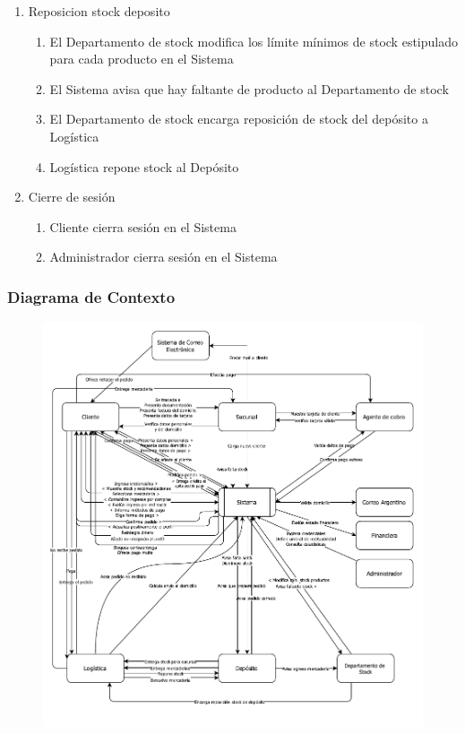 \begin{enumerate}
 \item Reposicion stock deposito
  \begin{enumerate}
    \item El Departamento de stock modifica los límite m\'inimos de stock estipulado para cada producto en el Sistema
    \item El Sistema avisa que hay faltante de producto al Departamento de stock
    \item El Departamento de stock encarga reposición de stock del depósito a Logística
    \item Logística repone stock al Depósito
  \end{enumerate}

 \item Cierre de sesi\'on
  \begin{enumerate}
    \item Cliente cierra sesión en el Sistema
    \item Administrador	cierra sesión en el Sistema
  \end{enumerate}
\end{enumerate}
\clearpage

\subsubsection{Diagrama de Contexto}

\begin{figure}[H]
  \includegraphics[width=\linewidth]{images/contexto.pdf}
  \caption{}
\end{figure}
